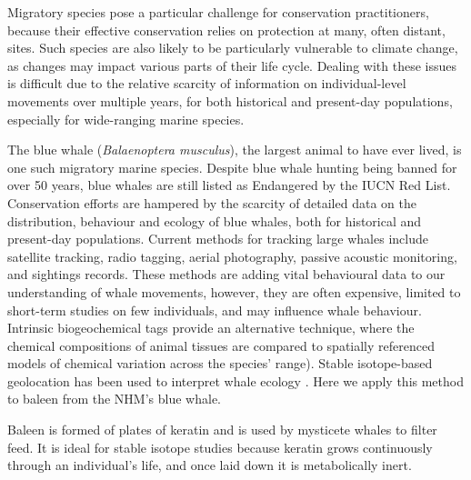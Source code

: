 \documentclass[a4paper,12pt]{article}
\begin{document}
Migratory species pose a particular challenge for conservation practitioners, because their effective conservation relies on protection at many, often distant, sites\cite{runge2014conserving}. 
Such species are also likely to be particularly vulnerable to climate change, as changes may impact various parts of their life cycle\cite{robinson2009travelling}. 
Dealing with these issues is difficult due to the relative scarcity of information on individual-level movements over multiple years, for both historical and present-day populations, especially for wide-ranging marine species\cite{ryan2013stable,hall2005stable,bailey2009behavioural}. 
 
The blue whale (\textit{Balaenoptera musculus}), the largest animal to have ever lived, is one such migratory marine species. 
Despite blue whale hunting being banned for over 50 years, blue whales are still listed as Endangered by the IUCN Red List\cite{reilly2008balaenoptera}.
Conservation efforts are hampered by the scarcity of detailed data on the distribution, behaviour and ecology of blue whales, both for historical and present-day populations. 
Current methods for tracking large whales include satellite tracking, radio tagging, aerial photography, passive acoustic monitoring, and sightings records\cite{borger15,mcdonald2006biogeographic,bailey2009behavioural,mate2007evolution,silva2013north}. 
These methods are adding vital behavioural data to our understanding of whale movements, however, they are often expensive, limited to short-term studies on few individuals\cite{bailey2009behavioural,best2015tag,mate2007evolution}, and may influence whale behaviour\cite{walker2012review}. 
Intrinsic biogeochemical tags provide an alternative technique, where the chemical compositions of animal tissues are compared to spatially referenced models of chemical variation across the species' range\cite{hobson1999tracing,hobson2008tracking}). 
Stable isotope-based geolocation has been used to interpret whale ecology \cite{hobson1998stable,ryan2013stable,eisenmann2016isotopic}. 
Here we apply this method to baleen from the NHM's blue whale.


 
Baleen is formed of plates of keratin and is used by mysticete whales to filter feed. 
It is ideal for stable isotope studies because keratin grows continuously through an individual's life, and once laid down it is metabolically inert\cite{best1996stable}. 
\end{document}
